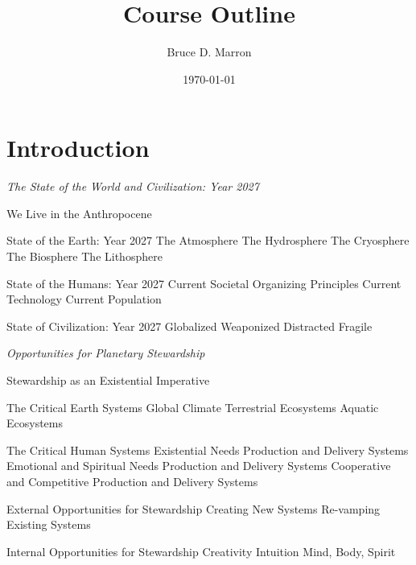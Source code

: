 \documentclass[12pt, letterpaper]{article}
\title{\vspace{-15mm}\fontsize{14pt}{10pt}
                    \selectfont \textbf{Course Outline}   %
                    \vspace{-7mm}
      }
\author{
     \normalsize Bruce D. Marron \\                     %
     \vspace{-5mm}
}
\date{\normalsize \today}
\begin{document}
\begin{singlespacing}
\maketitle                                      %
\end{singlespacing}
\thispagestyle{fancy}                           %


\section{Introduction}

\large
\begin{flushleft}
\textit{The State of the World and Civilization: Year 2027}
\end{flushleft}

\normalsize
\begin{outline}[enumerate]
\1 We Live in the Anthropocene

\1 State of the Earth: Year 2027
\2 The Atmosphere 
\2 The Hydrosphere 
\2 The Cryosphere
\2 The Biosphere
\2 The Lithosphere

\1 State of the Humans: Year 2027
\2 Current Societal Organizing Principles 
\2 Current Technology
\2 Current Population

\1 State of Civilization: Year 2027
\2 Globalized
\2 Weaponized
\2 Distracted
\2 Fragile
\end{outline}

\pagebreak

\large
\begin{flushleft}
\textit{Opportunities for Planetary Stewardship}
\end{flushleft}

\normalsize
\begin{outline}[enumerate]
\1 Stewardship as an Existential Imperative

\1 The Critical Earth Systems
\2 Global Climate
\2 Terrestrial Ecosystems
\2 Aquatic Ecosystems

\1 The Critical Human Systems
\2 Existential Needs Production and Delivery Systems
\2 Emotional and Spiritual Needs Production and Delivery Systems
\2 Cooperative and Competitive Production and Delivery Systems

\1 External Opportunities for Stewardship
\2 Creating New Systems
\2 Re-vamping Existing Systems

\1 Internal Opportunities for Stewardship
\2 Creativity
\2 Intuition
\2 Mind, Body, Spirit

\end{outline}
\end{document}
